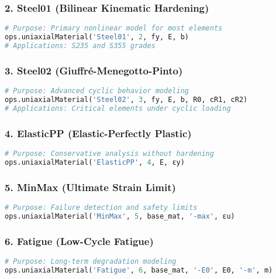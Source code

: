 \documentclass[12pt,a4paper]{article}
\begin{document}
\subsubsection{2. Steel01 (Bilinear Kinematic Hardening)}
\begin{lstlisting}[language=Python, caption=Steel01 Material Model]
# Purpose: Primary nonlinear model for most elements
ops.uniaxialMaterial('Steel01', 2, fy, E, b)
# Applications: S235 and S355 grades
\end{lstlisting}

\subsubsection{3. Steel02 (Giuffré-Menegotto-Pinto)}
\begin{lstlisting}[language=Python, caption=Steel02 Material Model]
# Purpose: Advanced cyclic behavior modeling
ops.uniaxialMaterial('Steel02', 3, fy, E, b, R0, cR1, cR2)
# Applications: Critical elements under cyclic loading
\end{lstlisting}

\subsubsection{4. ElasticPP (Elastic-Perfectly Plastic)}
\begin{lstlisting}[language=Python, caption=ElasticPP Material Model]
# Purpose: Conservative analysis without hardening
ops.uniaxialMaterial('ElasticPP', 4, E, εy)
\end{lstlisting}

\subsubsection{5. MinMax (Ultimate Strain Limit)}
\begin{lstlisting}[language=Python, caption=MinMax Material Model]
# Purpose: Failure detection and safety limits
ops.uniaxialMaterial('MinMax', 5, base_mat, '-max', εu)
\end{lstlisting}

\subsubsection{6. Fatigue (Low-Cycle Fatigue)}
\begin{lstlisting}[language=Python, caption=Fatigue Material Model]
# Purpose: Long-term degradation modeling
ops.uniaxialMaterial('Fatigue', 6, base_mat, '-E0', E0, '-m', m)
\end{lstlisting}
\end{document}
